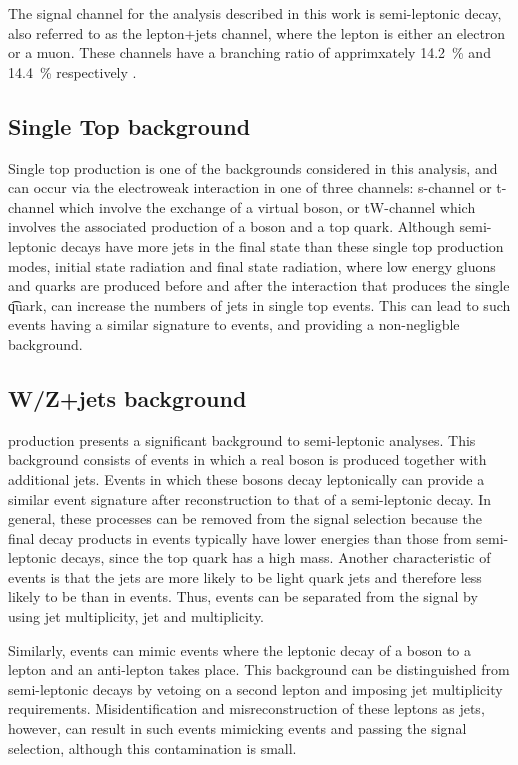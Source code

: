 The signal channel for the analysis described in this work is semi-leptonic \ttbar decay, also referred to as
the lepton+jets channel, where the lepton is either an electron or a muon. These channels have a branching
ratio of apprimxately 14.2~\% and 14.4~\% respectively \cite{Agashe:2014kda}.

\subsection{Single Top background}
\label{ss:single_top}
Single top production is one of the backgrounds considered in this analysis, and can occur via the electroweak
interaction in one of three channels: s-channel or t-channel which involve the exchange of a virtual \W boson,
or tW-channel which involves the associated production of a \W boson and a top quark. Although semi-leptonic
\ttbar decays have more jets in the final state than these single top production modes, initial state
radiation and final state radiation, where low energy gluons and quarks are produced before and after the
interaction that produces the single \t quark, can increase the numbers of jets in single top events. This can
lead to such events having a similar signature to \ttbar events, and providing a non-negligble background.

\subsection{W/Z+jets background}
\label{ss:w_z_plus_jets}
\WpJets production presents a significant background to semi-leptonic \ttbar analyses. This background
consists of events in which a real \W boson is produced together with additional jets. Events in which these
\W bosons decay leptonically can provide a similar event signature after reconstruction to that of a
semi-leptonic \ttbar decay. In general, these processes can be removed from the signal selection because the
final decay products in \WpJets events typically have lower energies than those from semi-leptonic \ttbar
decays, since the top quark has a high mass. Another characteristic of \WpJets events is that the jets are
more likely to be light quark jets and therefore less likely to be \bjets than in \ttbar events. Thus, \WpJets
events can be separated from the \ttbar signal by using jet multiplicity, jet \pt and \bjet multiplicity.

Similarly, \ZpJets events can mimic \ttbar events where the leptonic decay of a \Z boson to a lepton and an
anti-lepton takes place. This background can be distinguished from semi-leptonic \ttbar decays by
vetoing on a second lepton and imposing jet multiplicity requirements. Misidentification and misreconstruction
of these leptons as jets, however, can result in such events mimicking \ttbar events and passing the signal
selection, although this contamination is small.

